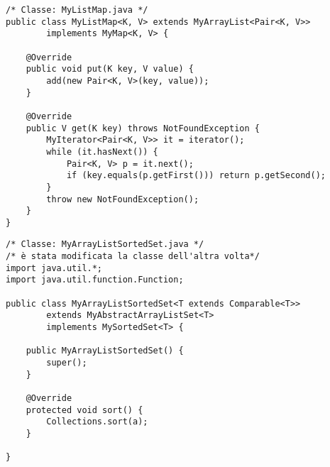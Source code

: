 \begin{lstlisting}[basicstyle=\small,]
/* Classe: MyListMap.java */
public class MyListMap<K, V> extends MyArrayList<Pair<K, V>>
        implements MyMap<K, V> {

    @Override
    public void put(K key, V value) {
        add(new Pair<K, V>(key, value));
    }

    @Override
    public V get(K key) throws NotFoundException {
        MyIterator<Pair<K, V>> it = iterator();
        while (it.hasNext()) {
            Pair<K, V> p = it.next();
            if (key.equals(p.getFirst())) return p.getSecond();
        }
        throw new NotFoundException();
    }
}
\end{lstlisting}

\begin{lstlisting}[basicstyle=\small,]
/* Classe: MyArrayListSortedSet.java */
/* è stata modificata la classe dell'altra volta*/
import java.util.*;
import java.util.function.Function;

public class MyArrayListSortedSet<T extends Comparable<T>>
        extends MyAbstractArrayListSet<T>
        implements MySortedSet<T> {

    public MyArrayListSortedSet() {
        super();
    }

    @Override
    protected void sort() {
        Collections.sort(a);
    }

}
\end{lstlisting}

